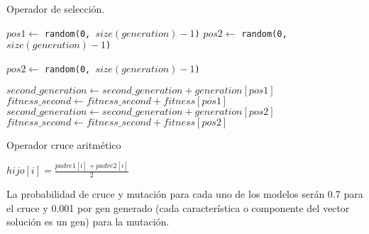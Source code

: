 \newpage
\begin{algorithm}[H]
	\caption{Operador de selección.}
	\label{alg:opsel}
	\begin{algorithmic}[1]
		
		\State $pos1 \gets$ \texttt{random(0, $size(generation)-1$)}
		\State $pos2 \gets$ \texttt{random(0, $size(generation)-1$)}
		
		\vspace{0.2cm}
		
		\State $pos2 \gets$ \texttt{random(0, $size(generation)-1 $)}
		\EndWhile
		
		\vspace{0.2cm}
		
		\State $second\_generation \gets second\_generation + generation[pos1]$
		\State $fitness\_second \gets fitness\_second + fitness[pos1]$
		\Else
		\State $second\_generation \gets second\_generation + generation[pos2]$
		\State $fitness\_second \gets fitness\_second + fitness[pos2]$				
		\EndIf
		
		\EndFor
		
		\EndProcedure
	\end{algorithmic}
\end{algorithm}

\begin{algorithm} [H]
\caption{Operador cruce aritmético}
	\label{alg:operadorcruce}
	\begin{algorithmic}[1]
			
				
				\State $hijo[i] = \frac{padre1[i]+padre2[i]}{2}$
			\EndFor
		\EndProcedure
		\end{algorithmic}
\end{algorithm}

La probabilidad de cruce y mutación para cada uno de los modelos serán 0.7 para el cruce y 0.001 por gen generado (cada característica o componente del vector solución es un gen) para la mutación.

